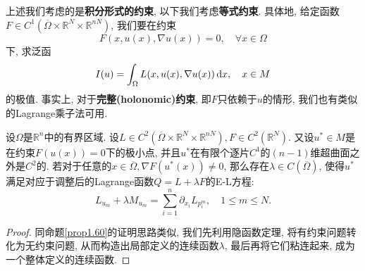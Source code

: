 上述我们考虑的是\textbf{积分形式的约束}, 以下我们考虑\textbf{等式约束}. 具体地, 给定函数$F \in C^1(\overline{\Omega} \times \mathbb{R}^N \times \mathbb{R}^{nN})$, 我们要在约束 
\begin{equation*}
    F(x, u(x), \nabla u(x)) = 0, \quad \forall x \in \Omega
\end{equation*}
下, 求泛函 
\begin{equation*}
    I(u) = \int_{\Omega} L(x, u(x), \nabla u(x)) \,{\rm d}x, \quad x \in M 
\end{equation*}
的极值. 事实上, 对于\textbf{完整(holonomic)约束}, 即$F$只依赖于$u$的情形, 我们也有类似的Lagrange乘子法可用.

\begin{proposition}\label{prop1.62}
    设$\Omega$是$\mathbb{R}^n$中的有界区域. 设$L \in C^2(\overline{\Omega} \times \mathbb{R}^N \times \mathbb{R}^{nN}), F \in C^2(\mathbb{R}^N)$.
    又设$u^* \in M$是在约束$F(u(x)) = 0$下的极小点, 并且$u^*$在有限个逐片$C^1$的$(n - 1)$维超曲面之外是$C^2$的.
    若对于任意的$x \in \overline{\Omega}, \nabla F(u^*(x)) \neq 0$, 那么存在$\lambda \in C(\overline{\Omega})$, 使得$u^*$满足对应于调整后的Lagrange函数$Q = L + \lambda F$的E-L方程:
    \begin{equation}\label{20}
        \boxed{L_{u_m} + \lambda M_{u_m} = \sum_{i = 1}^n\partial_{x_i}L_{p_i^m}, \quad 1 \leq m \leq N.}
    \end{equation}
    \begin{proof}
        同命题\ref{prop1.60}的证明思路类似, 我们先利用隐函数定理, 将有约束问题转化为无约束问题, 从而构造出局部定义的连续函数$\lambda$, 最后再将它们粘连起来, 成为一个整体定义的连续函数.


\end{proof}
\end{proposition}
